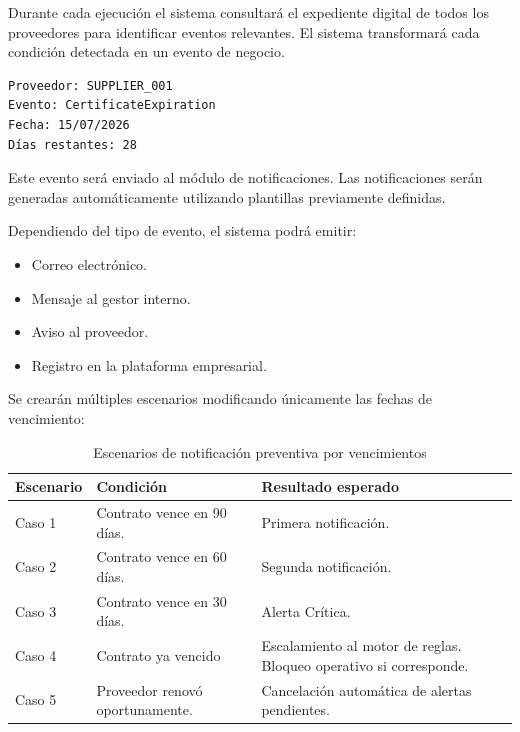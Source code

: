 \documentclass[12pt]{article}
\begin{document}
Durante cada ejecución el sistema consultará el expediente digital de todos los proveedores para identificar eventos relevantes. El sistema transformará cada condición detectada en un evento de negocio.

\begin{verbatim}
Proveedor: SUPPLIER_001
Evento: CertificateExpiration
Fecha: 15/07/2026
Días restantes: 28
\end{verbatim}

Este evento será enviado al módulo de notificaciones. Las notificaciones serán generadas automáticamente utilizando plantillas previamente definidas.

Dependiendo del tipo de evento, el sistema podrá emitir:

\begin{itemize}
    \item Correo electrónico.
    \item Mensaje al gestor interno.
    \item Aviso al proveedor.
    \item Registro en la plataforma empresarial.
\end{itemize}

Se crearán múltiples escenarios modificando únicamente las fechas de vencimiento:

\begin{table}[htbp]
\centering
\caption{Escenarios de notificación preventiva por vencimientos}
\vspace{0.3cm}
\label{tab:escenarios-notificaciones}
\renewcommand{\arraystretch}{1.2}
\begin{tabularx}{\textwidth}{|p{2.6cm}|>{\raggedright\arraybackslash}X|>{\raggedright\arraybackslash}X|}
\hline
\textbf{Escenario} & \textbf{Condición} & \textbf{Resultado esperado} \\
\hline
Caso 1 & Contrato vence en 90 días. & Primera notificación. \\
\hline
Caso 2 & Contrato vence en 60 días. & Segunda notificación. \\
\hline
Caso 3 & Contrato vence en 30 días. & Alerta Crítica. \\
\hline
Caso 4 & Contrato ya vencido & Escalamiento al motor de reglas. \newline Bloqueo operativo si corresponde. \\
\hline
Caso 5 & Proveedor renovó oportunamente. & Cancelación automática de alertas pendientes. \\
\hline
\end{tabularx}
\end{table}
\end{document}
